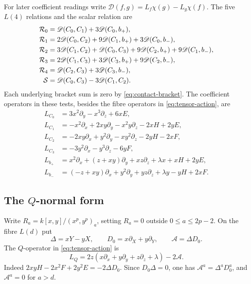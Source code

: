 \documentclass[11pt]{article}
\theoremstyle{plain}
\theoremstyle{definition}
\theoremstyle{remark}
\numberwithin{equation}{section}
\newcommand{\kk}{k}
\begin{document}
For later coefficient readings write
\(\mathscr D(f,g)=L_f\chi(g)-L_g\chi(f)\).
The five \(L(4)\) relations and the scalar relation are
\begin{align}
 \mathcal R_0&=\mathscr D(C_0,C_1)+3\mathscr D(C_0,b_+),\notag\\
 \mathcal R_1&=2\mathscr D(C_0,C_2)+9\mathscr D(C_1,b_+)
                                      +3\mathscr D(C_0,b_-),\notag\\
 \mathcal R_2&=3\mathscr D(C_1,C_2)+\mathscr D(C_0,C_3)
                 +9\mathscr D(C_2,b_+)+9\mathscr D(C_1,b_-),\notag\\
 \mathcal R_3&=2\mathscr D(C_1,C_3)+3\mathscr D(C_3,b_+)
                                      +9\mathscr D(C_2,b_-),\notag\\
 \mathcal R_4&=\mathscr D(C_2,C_3)+3\mathscr D(C_3,b_-),\label{eq:six-quadratic-tests}\\
 \mathcal S&=\mathscr D(C_0,C_3)-3\mathscr D(C_1,C_2).\notag
\end{align}
Each underlying bracket sum is zero by
\eqref{eq:contact-bracket}.
The coefficient operators in these tests, besides the fibre
operators in \eqref{eq:tensor-action}, are
\begin{align*}
 L_{C_0}&=3x^2\partial_y-x^3\partial_z+6xE,\\
 L_{C_1}&=-x^2\partial_x+2xy\partial_y-x^2y\partial_z-2xH+2yE,\\
 L_{C_2}&=-2xy\partial_x+y^2\partial_y-xy^2\partial_z-2yH-2xF,\\
 L_{C_3}&=-3y^2\partial_x-y^3\partial_z-6yF,\\
 L_{b_+}&=x^2\partial_x+(z+xy)\partial_y+xz\partial_z
                                        +\lambda x+xH+2yE,\\
 L_{b_-}&=(-z+xy)\partial_x+y^2\partial_y+yz\partial_z
                                        +\lambda y-yH+2xF.
\end{align*}

\subsection{The \texorpdfstring{$Q$}{Q}-normal form}\label{sec:Q-normal}

Write \(R_a=\kk[x,y]/(x^p,y^p)_a\), setting \(R_a=0\) outside
\(0\le a\le2p-2\).
On the fibre \(L(d)\) put
\[
 \Delta=xY-yX,\qquad
 D_0=x\partial_X+y\partial_Y,\qquad
 \mathcal A=\Delta D_0 .
\]
The \(Q\)-operator in \eqref{eq:tensor-action} is
\begin{equation}\label{eq:Q-full-factorisation}
 L_Q=2z(x\partial_x+y\partial_y+z\partial_z+\lambda)-2\mathcal A .
\end{equation}
Indeed \(2xyH-2x^2F+2y^2E=-2\Delta D_0\).
Since \(D_0\Delta=0\), one has
\(\mathcal A^a=\Delta^aD_0^a\), and \(\mathcal A^a=0\) for \(a>d\).
\end{document}
